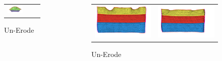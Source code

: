 \documentclass{beamer}
\begin{document}
\begin{frame}
\begin{columns}
\begin{column}{0.55\textwidth}
\begin{figure}[H]
\begin{tabular}{@{}ccc@{}}
	\includegraphics[width=.43\textwidth]{unErodeMesh2.png}\\
	\end{tabular}
	\caption{Un-Erode}
	\label{unerodecveg}
	\end{figure}
	\end{column}
	\begin{column}{0.55\textwidth}
	\begin{figure}[H]
	\centering
	\begin{tabular}{@{}cc@{}}
	\includegraphics[width=.43\textwidth]{unErodehole0.png}&
	\includegraphics[width=.43\textwidth]{unErodehole1.png}\\
	\end{tabular}
	\caption{Un-Erode}
	\label{unfoldeg}
	\end{figure}
	\end{column}
	\end{columns}
	\end{frame}	
	
\end{document}
